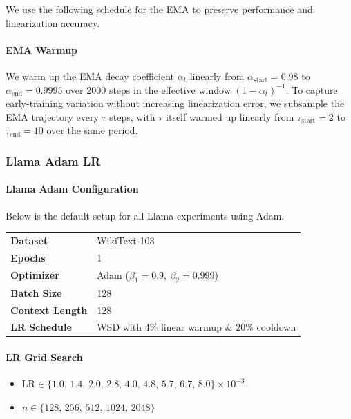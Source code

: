 \documentclass{article} %
\begin{document}
We use the following schedule for the EMA to preserve performance and linearization accuracy.

\paragraph{EMA Warmup}  
We warm up the EMA decay coefficient \(\alpha_t\) linearly from \(\alpha_{\mathrm{start}}=0.98\) to \(\alpha_{\mathrm{end}}=0.9995\) over 2000 steps in the effective window \((1-\alpha_t)^{-1}\). To capture early-training variation without increasing linearization error, we subsample the EMA trajectory every \(\tau\) steps, with \(\tau\) itself warmed up linearly from \(\tau_{\mathrm{start}}=2\) to \(\tau_{\mathrm{end}}=10\) over the same period.

\subsubsection{Llama Adam LR}\label{app:llama_adam_lr}
\paragraph{Llama Adam Configuration}
Below is the default setup for all Llama experiments using Adam.  

\begin{table}[ht]
\centering
\small
\renewcommand{\arraystretch}{1.2}
\begin{tabular}{@{}ll@{}}
\toprule
\textbf{Dataset}       & WikiText-103                                        \\ 
\addlinespace
\textbf{Epochs}        & 1                                                   \\ 
\addlinespace
\textbf{Optimizer}     & Adam ($\beta_1=0.9,\ \beta_2=0.999$) \\

\addlinespace
\textbf{Batch Size}     & 128 \\

\addlinespace
\textbf{Context Length}     & 128 \\

\addlinespace
\textbf{LR Schedule}   & WSD with 4\% linear warmup \& 20\% cooldown         \\ 
\bottomrule
\end{tabular}
\end{table}



\paragraph{LR Grid Search}
\begin{itemize}[nosep,leftmargin=*]
  \item \(\displaystyle \mathrm{LR} \in \{1.0,\,1.4,\,2.0,\,2.8,\,4.0,\,4.8,\,5.7,\,6.7,\,8.0\}\times10^{-3}\)
  
  \vspace{2mm}
  
  \item \(n \in \{128,\,256,\,512,\,1024,\,2048\}\)
\end{itemize}
\end{document}
